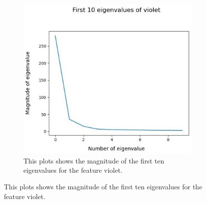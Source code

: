 
\begin{figure}[!h]
	\centering
	\begin{subfigure}{0.7\textwidth}
		\includegraphics[width=0.9\linewidth]{Figures/chapter04/pca_violet_graph.png} 
		\caption{This plots shows the magnitude of the first ten eigenvalues for the feature violet.}
	\end{subfigure}
	\vspace{20pt}
	

\end{figure}

